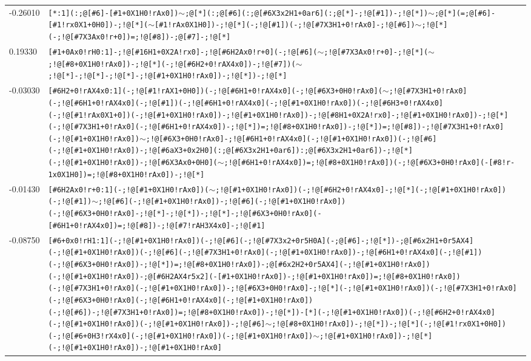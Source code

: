 \begin{longtable}{>{\baselineskip=10pt}p{} >{\baselineskip=10pt}p{}}
-0.26010 & \texttt{[*:1](:;@[\#6]-[\#1+0X1H0!rAx0])$\sim$;@[*](:;@[\#6](:;@[\#6X3x2H1+0ar6](:;@[*]-;!@[\#1])-;!@[*])$\sim$;@[*](=;@[\#6]-[\#1!rx0X1+0H0])-;!@[*]($\sim$[\#1!rAx0X1H0])-;!@[*](-;!@[\#1])(-;!@[\#7X3H1+0!rAx0]-;!@[\#6])$\sim$;!@[*](-;!@[\#7X3Ax0!r+0])=;!@[\#8])-;@[\#7]-;!@[*]} \\ 
0.19330 & \texttt{[\#1+0Ax0!rH0:1]-;!@[\#16H1+0X2A!rx0]-;!@[\#6H2Ax0!r+0](-;!@[\#6]($\sim$;!@[\#7X3Ax0!r+0]-;!@[*]($\sim$;!@[\#8+0X1H0!rAx0])-;!@[*](-;!@[\#6H2+0!rAX4x0])-;!@[\#7])($\sim$;!@[*]-;!@[*]-;!@[*]-;!@[\#1+0X1H0!rAx0])-;!@[*])-;!@[*]} \\ 
-0.03030 & \texttt{[\#6H2+0!rAX4x0:1](-;!@[\#1!rAX1+0H0])(-;!@[\#6H1+0!rAX4x0](-;!@[\#6X3+0H0!rAx0]($\sim$;!@[\#7X3H1+0!rAx0](-;!@[\#6H1+0!rAX4x0](-;!@[\#1])(-;!@[\#6H1+0!rAX4x0](-;!@[\#1+0X1H0!rAx0])(-;!@[\#6H3+0!rAX4x0](-;!@[\#1!rAx0X1+0])(-;!@[\#1+0X1H0!rAx0])-;!@[\#1+0X1H0!rAx0])-;!@[\#8H1+0X2A!rx0]-;!@[\#1+0X1H0!rAx0])-;!@[*](-;!@[\#7X3H1+0!rAx0](-;!@[\#6H1+0!rAX4x0])-;!@[*])=;!@[\#8+0X1H0!rAx0])-;!@[*])=;!@[\#8])-;!@[\#7X3H1+0!rAx0](-;!@[\#1+0X1H0!rAx0])$\sim$;!@[\#6X3+0H0!rAx0]-;!@[\#6H1+0!rAX4x0](-;!@[\#1+0X1H0!rAx0])(-;!@[\#6](-;!@[\#1+0X1H0!rAx0])-;!@[\#6aX3+0x2H0](:;@[\#6X3x2H1+0ar6]):;@[\#6X3x2H1+0ar6])-;!@[*](-;!@[\#1+0X1H0!rAx0])-;!@[\#6X3Ax0+0H0]($\sim$;!@[\#6H1+0!rAX4x0])=;!@[\#8+0X1H0!rAx0])(-;!@[\#6X3+0H0!rAx0](-[\#8!r-1x0X1H0])=;!@[\#8+0X1H0!rAx0])-;!@[*]} \\ 
-0.01430 & \texttt{[\#6H2Ax0!r+0:1](-;!@[\#1+0X1H0!rAx0])($\sim$;!@[\#1+0X1H0!rAx0])(-;!@[\#6H2+0!rAX4x0]-;!@[*](-;!@[\#1+0X1H0!rAx0])(-;!@[\#1])$\sim$;!@[\#6](-;!@[\#1+0X1H0!rAx0])-;!@[\#6](-;!@[\#1+0X1H0!rAx0])(-;!@[\#6X3+0H0!rAx0]-;!@[*]-;!@[*])-;!@[*]-;!@[\#6X3+0H0!rAx0](-[\#6H1+0!rAX4x0])=;!@[\#8])-;!@[\#7!rAH3X4x0]-;!@[\#1]} \\ 
-0.08750 & \texttt{[\#6+0x0!rH1:1](-;!@[\#1+0X1H0!rAx0])(-;!@[\#6](-;!@[\#7X3x2+0r5H0A](-;@[\#6]-;!@[*])-;@[\#6x2H1+0r5AX4](-;!@[\#1+0X1H0!rAx0])(-;!@[\#6](-;!@[\#7X3H1+0!rAx0](-;!@[\#1+0X1H0!rAx0])-;!@[\#6H1+0!rAX4x0](-;!@[\#1])(-;!@[\#6X3+0H0!rAx0])-;!@[*])=;!@[\#8+0X1H0!rAx0])-;@[\#6x2H2+0r5AX4](-;!@[\#1+0X1H0!rAx0])(-;!@[\#1+0X1H0!rAx0])-;@[\#6H2AX4r5x2](-[\#1+0X1H0!rAx0])-;!@[\#1+0X1H0!rAx0])=;!@[\#8+0X1H0!rAx0])(-;!@[\#7X3H1+0!rAx0](-;!@[\#1+0X1H0!rAx0])-;!@[\#6X3+0H0!rAx0]-;!@[*](-;!@[\#1+0X1H0!rAx0])(-;!@[\#7X3H1+0!rAx0](-;!@[\#6X3+0H0!rAx0](-;!@[\#6H1+0!rAX4x0](-;!@[\#1+0X1H0!rAx0])(-;!@[\#6])-;!@[\#7X3H1+0!rAx0])=;!@[\#8+0X1H0!rAx0])-;!@[*])-[*](-;!@[\#1+0X1H0!rAx0])(-;!@[\#6H2+0!rAX4x0](-;!@[\#1+0X1H0!rAx0])(-;!@[\#1+0X1H0!rAx0])-;!@[\#6]$\sim$;!@[\#8+0X1H0!rAx0])-;!@[*])-;!@[*](-;!@[\#1!rx0X1+0H0])(-;!@[\#6+0H3!rX4x0](-;!@[\#1+0X1H0!rAx0])(-;!@[\#1+0X1H0!rAx0])$\sim$;!@[\#1+0X1H0!rAx0])-;!@[*](-;!@[\#1+0X1H0!rAx0])-;!@[\#1+0X1H0!rAx0]} \\ 

\end{longtable}
